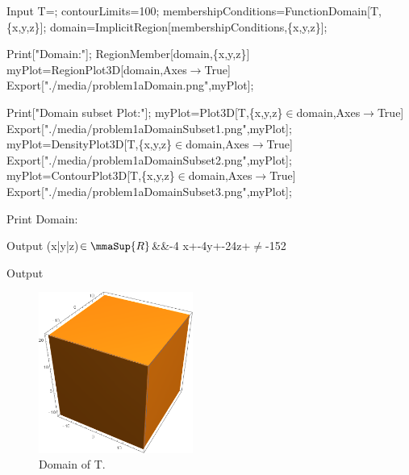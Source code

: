 \documentclass[11pt,a4paper]{article}
\begin{document}
\begin{mmaCell}[moredefined={T, contourLimits, membershipConditions, domain, myPlot}]{Input}
T=;
contourLimits=100;
membershipConditions=FunctionDomain[T,\{x,y,z\}];
domain=ImplicitRegion[membershipConditions,\{x,y,z\}];

Print["Domain:"];
RegionMember[domain,\{x,y,z\}]
myPlot=RegionPlot3D[domain,Axes\(\pmb{\to}\)True]
Export["./media/problem1aDomain.png",myPlot];

Print["Domain subset Plot:"];
myPlot=Plot3D[T,\{x,y,z\}\(\pmb{\in}\)domain,Axes\(\pmb{\to}\)True]
Export["./media/problem1aDomainSubset1.png",myPlot];
myPlot=DensityPlot3D[T,\{x,y,z\}\(\pmb{\in}\)domain,Axes\(\pmb{\to}\)True]
Export["./media/problem1aDomainSubset2.png",myPlot];
myPlot=ContourPlot3D[T,\{x,y,z\}\(\pmb{\in}\)domain,Axes\(\pmb{\to}\)True]
Export["./media/problem1aDomainSubset3.png",myPlot];
\end{mmaCell}

\begin{mmaCell}{Print}
Domain:
\end{mmaCell}

\begin{mdframed}
\begin{mmaCell}[]{Output}
(x|y|z)\(\in\mmaSup{R}\)&&-4 x+-4y+-24z+\(\neq\)-152
\end{mmaCell}
\end{mdframed}

\begin{mmaCell}[]{Output}

\end{mmaCell}
\begin{figure}[!h]
\centering
\includegraphics[width=0.45\textwidth]{./media/problem1aDomain.png}
\caption{Domain of T.\label{figure_ambush}}
\end{figure}
\end{document}

